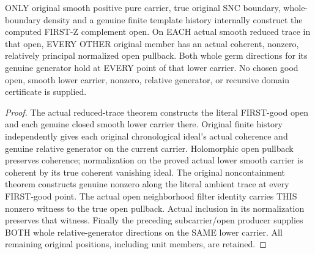 \begin{theorem}
\label{hir:sharp-original-first-good-actual-lower-member-geometry}
\leanok
ONLY original smooth positive pure carrier, true original SNC boundary,
whole-boundary density and a genuine finite template history internally
construct the computed FIRST-Z complement open. On EACH actual smooth
reduced trace in that open, EVERY OTHER original member has an actual
coherent, nonzero, relatively principal normalized open pullback. Both
whole germ directions for its genuine generator hold at EVERY point of
that lower carrier. No chosen good open, smooth lower carrier, nonzero,
relative generator, or recursive domain certificate is supplied.
\end{theorem}
\begin{proof}
The actual reduced-trace theorem constructs the literal FIRST-good open
and each genuine closed smooth lower carrier there. Original finite
history independently gives each original chronological ideal's actual
coherence and genuine relative generator on the current carrier.
Holomorphic open pullback preserves coherence; normalization on the
proved actual lower smooth carrier is coherent by its true coherent
vanishing ideal. The original noncontainment theorem constructs genuine
nonzero along the literal ambient trace at every FIRST-good point.
The actual open neighborhood filter identity carries THIS nonzero witness
to the true open pullback. Actual inclusion in its normalization preserves
that witness. Finally the preceding subcarrier/open producer supplies
BOTH whole relative-generator directions on the SAME lower carrier.
All remaining original positions, including unit members, are retained.
\end{proof}

